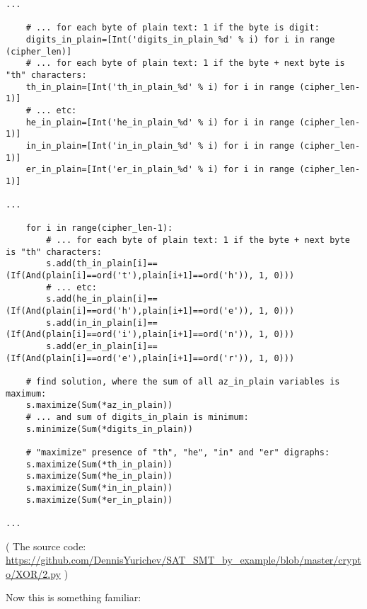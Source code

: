 \begin{lstlisting}
...

    # ... for each byte of plain text: 1 if the byte is digit:
    digits_in_plain=[Int('digits_in_plain_%d' % i) for i in range (cipher_len)]
    # ... for each byte of plain text: 1 if the byte + next byte is "th" characters:
    th_in_plain=[Int('th_in_plain_%d' % i) for i in range (cipher_len-1)]
    # ... etc:
    he_in_plain=[Int('he_in_plain_%d' % i) for i in range (cipher_len-1)]
    in_in_plain=[Int('in_in_plain_%d' % i) for i in range (cipher_len-1)]
    er_in_plain=[Int('er_in_plain_%d' % i) for i in range (cipher_len-1)]

...

    for i in range(cipher_len-1):
        # ... for each byte of plain text: 1 if the byte + next byte is "th" characters:
        s.add(th_in_plain[i]==(If(And(plain[i]==ord('t'),plain[i+1]==ord('h')), 1, 0)))
        # ... etc:
        s.add(he_in_plain[i]==(If(And(plain[i]==ord('h'),plain[i+1]==ord('e')), 1, 0)))
        s.add(in_in_plain[i]==(If(And(plain[i]==ord('i'),plain[i+1]==ord('n')), 1, 0)))
        s.add(er_in_plain[i]==(If(And(plain[i]==ord('e'),plain[i+1]==ord('r')), 1, 0)))

    # find solution, where the sum of all az_in_plain variables is maximum:
    s.maximize(Sum(*az_in_plain))
    # ... and sum of digits_in_plain is minimum:
    s.minimize(Sum(*digits_in_plain))

    # "maximize" presence of "th", "he", "in" and "er" digraphs:
    s.maximize(Sum(*th_in_plain))
    s.maximize(Sum(*he_in_plain))
    s.maximize(Sum(*in_in_plain))
    s.maximize(Sum(*er_in_plain))

...
\end{lstlisting}

( The source code: \url{https://github.com/DennisYurichev/SAT_SMT_by_example/blob/master/crypto/XOR/2.py} )

Now this is something familiar:

